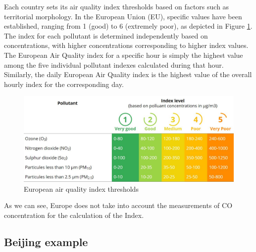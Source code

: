 Each country sets its air quality index thresholds based on factors such as territorial morphology. In the European Union (EU), specific values have been established, ranging from 1 (good) to 6 (extremely poor), as depicted in Figure \ref{fig:euaqitable}. The index for each pollutant is determined independently based on concentrations, with higher concentrations corresponding to higher index values. The European Air Quality index for a specific hour is simply the highest value among the five individual pollutant indexes calculated during that hour. Similarly, the daily European Air Quality index is the highest value of the overall hourly index for the corresponding day.
\begin{figure}
    \centering
    \includegraphics[width=1\linewidth]{images/airqualityindexcalc.png}
    \caption{European air quality index thresholds}
    \label{fig:euaqitable}
\end{figure}

As we can see, Europe does not take into account the measurements of CO concentration for the calculation of the Index.

\subsection{Beijing example}

